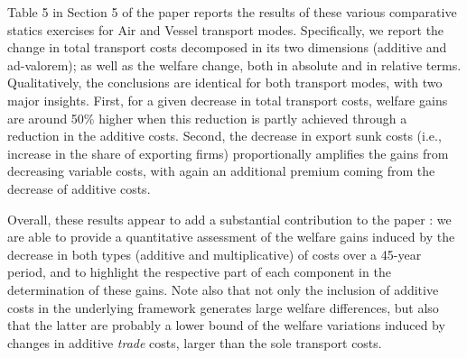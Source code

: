 \documentclass[a4paper,11pt]{article}
\begin{document}
\begin{itemize}
\begin{enumerate}
\begin{table}[htbp]
Table 5 in Section 5 of the paper reports the results of these various comparative statics exercises for Air and Vessel transport modes. Specifically, we report the change in total transport costs decomposed in its two dimensions (additive and ad-valorem); as well as the welfare change, both in absolute and in relative terms. Qualitatively, the conclusions are identical for both transport modes, with two major insights. First, for a given decrease in total transport costs,  welfare gains are around 50\% higher when this reduction is partly achieved through a reduction in the additive costs. Second, the decrease in export sunk costs (i.e., increase in the share of exporting firms) proportionally amplifies the gains from decreasing variable costs, with again an additional premium coming from the decrease of additive costs.

Overall, these results appear to add a substantial contribution to the paper : we are able to provide a quantitative assessment of the welfare gains induced by the decrease in both types (additive and multiplicative) of costs over a 45-year period, and to highlight the respective part of each component in the determination of these gains. Note also that not only the inclusion of additive costs in the underlying framework generates large welfare differences, but also that the latter are probably a lower bound of the welfare variations induced by changes in additive \emph{trade} costs, larger than the sole transport costs.









\end{table}
\end{enumerate}
\end{itemize}
\end{document}
